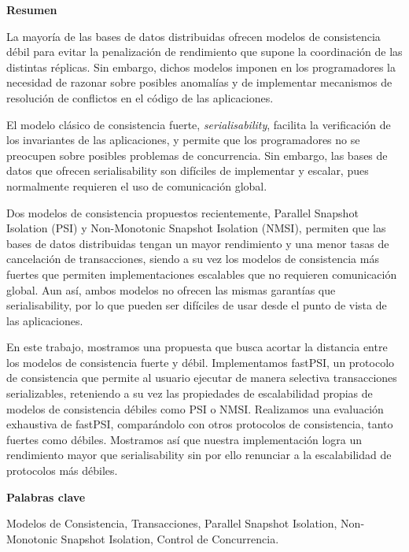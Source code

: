 \newpage

\begin{center}
{\bf \Huge Resumen}
\end{center}

\vspace{1cm}

La mayoría de las bases de datos distribuidas ofrecen modelos de consistencia débil
para evitar la penalización de rendimiento que supone la coordinación de las distintas
réplicas. Sin embargo, dichos modelos imponen en los programadores la necesidad de
razonar sobre posibles anomalías y de implementar mecanismos de resolución de
conflictos en el código de las aplicaciones.

El modelo clásico de consistencia fuerte, \emph{serialisability}, facilita la
verificación de los invariantes de las aplicaciones, y permite que los programadores
no se preocupen sobre posibles problemas de concurrencia. Sin embargo, las bases de datos
que ofrecen serialisability son difíciles de implementar y escalar, pues normalmente
requieren el uso de comunicación global.

Dos modelos de consistencia propuestos recientemente, Parallel Snapshot Isolation
(PSI) y Non-Monotonic Snapshot Isolation (NMSI), permiten que las bases de datos
distribuidas tengan un mayor rendimiento y una menor tasas de cancelación de
transacciones, siendo a su vez los modelos de consistencia más fuertes que permiten
implementaciones escalables que no requieren comunicación global. Aun así,
ambos modelos no ofrecen las mismas garantías que serialisability, por lo que
pueden ser difíciles de usar desde el punto de vista de las aplicaciones.

En este trabajo, mostramos una propuesta que busca acortar la distancia entre los modelos
de consistencia fuerte y débil. Implementamos fastPSI, un protocolo de consistencia
que permite al usuario ejecutar de manera selectiva transacciones serializables,
reteniendo a su vez las propiedades de escalabilidad propias de modelos de consistencia
débiles como PSI o NMSI. Realizamos una evaluación exhaustiva de fastPSI, comparándolo
con otros protocolos de consistencia, tanto fuertes como débiles. Mostramos así
que nuestra implementación logra un rendimiento mayor que serialisability sin por
ello renunciar a la escalabilidad de protocolos más débiles.

\vspace{1cm}

\begin{center}
{\bf \Large Palabras clave}
\end{center}

\vspace{0.5cm}

Modelos de Consistencia, Transacciones, Parallel Snapshot Isolation, Non-Monotonic Snapshot Isolation, Control de Concurrencia.
